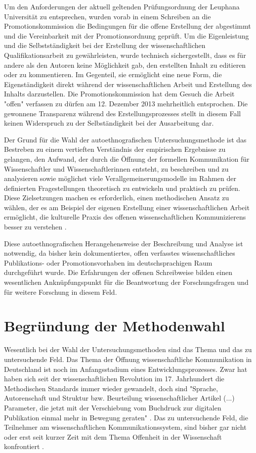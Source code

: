 Um den Anforderungen der aktuell geltenden Prüfungsordnung der Leuphana Universität zu entsprechen, wurden vorab in einem Schreiben an die Promotionskommission die Bedingungen für die offene Erstellung der abgestimmt und die Vereinbarkeit mit der Promotionsordnung geprüft. Um die Eigenleistung und die Selbstständigkeit bei der Erstellung der wissenschaftlichen Qualifikationsarbeit zu gewährleisten, wurde technisch sichergestellt, dass es für andere als den Autoren keine Möglichkeit gab, den erstellten Inhalt zu editieren oder zu kommentieren. Im Gegenteil, sie ermöglicht eine neue Form, die Eigenständigkeit direkt während der wissenschaftlichen Arbeit und Erstellung des Inhalts darzustellen. Die Promotionskommission hat dem Gesuch die Arbeit "offen" verfassen zu dürfen am 12. Dezember 2013 mehrheitlich entsprochen. Die gewonnene Transparenz während des Erstellungsprozesses stellt in diesem Fall keinen Widerspruch zu der Selbständigkeit bei der Ausarbeitung dar.

Der Grund für die Wahl der autoethnografischen Untersuchungsmethode ist das Bestreben zu einem vertieften Verständnis der empirischen Ergebnisse zu gelangen, den Aufwand, der durch die Öffnung der formellen Kommunikation für Wissenschaftler und Wissenschaftlerinnen entsteht, zu beschreiben und zu analysieren sowie möglichst viele Verallgemeinerungsmodelle im Rahmen der definierten Fragestellungen theoretisch zu entwickeln und praktisch zu prüfen. Diese Zielsetzungen machen es erforderlich, einen methodischen Ansatz zu wählen, der es am Beispiel der eigenen Erstellung einer wissenschaftlichen Arbeit ermöglicht, die kulturelle Praxis des offenen wissenschaftlichen Kommunizierens besser zu verstehen \cite{maso_2001_phenomenology}.

Diese autoethnografischen Herangehensweise der Beschreibung und Analyse ist notwendig, da bisher kein dokumentiertes, offen verfasstes wissenschaftliches Publikations- oder Promotionsvorhaben im deutschsprachigen Raum durchgeführt wurde. Die Erfahrungen der offenen Schreibweise bilden einen wesentlichen Anknüpfungspunkt für die Beantwortung der Forschungsfragen und für weitere Forschung in diesem Feld.

\section{Begründung der Methodenwahl}

Wesentlich bei der Wahl der Untersuchungsmethoden sind das Thema und das zu untersuchende Feld. Das Thema der Öffnung wissenschaftliche Kommunikation in Deutschland ist noch im Anfangsstadium eines Entwicklungsprozesses. Zwar hat haben sich seit der wissenschaftlichen Revolution im 17. Jahrhundert die Methodischen Standards immer wieder gewandelt, doch sind "Sprache, Autorenschaft und Struktur bzw. Beurteilung wissenschaftlicher Artikel (...) Parameter, die jetzt mit der Verschiebung vom Buchdruck zur digitalen Publikation einmal mehr in Bewegung geraten" \cite{hagner_2015_sache_buches}. Das zu untersuchende Feld, die Teilnehmer am wissenschaftlichen Kommunikationssystem, sind bisher gar nicht oder erst seit kurzer Zeit mit dem Thema Offenheit in der Wissenschaft konfrontiert \cite{hagner_2015_sache_buches}.

